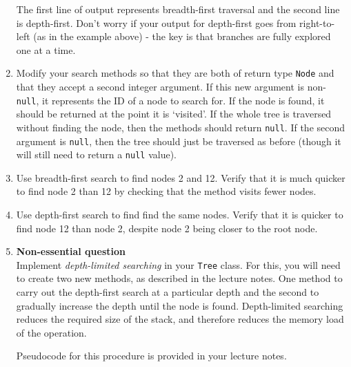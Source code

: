 \documentclass[11pt,a4paper]{report}
\begin{document}
\begin{enumerate}
The first line of output represents breadth-first traversal and the second line is depth-first. Don't worry if your output for depth-first goes from right-to-left (as in the example above) - the key is that branches are fully explored one at a time. 

\item Modify your search methods so that they are both of return type \texttt{Node} and that they accept a second integer argument. If this new argument is non-\texttt{null}, it represents the ID of a node to search for. If the node is found, it should be returned at the point it is `visited'. If the whole tree is traversed without finding the node, then the methods should return \texttt{null}. If the second argument is \texttt{null}, then the tree should just be traversed as before (though it will still need to return a \texttt{null} value).

\item Use breadth-first search to find nodes 2 and 12. Verify that it is much quicker to find node 2 than 12 by checking that the method visits fewer nodes.

\item Use depth-first search to find find the same nodes. Verify that it is quicker to find node 12 than node 2, despite node 2 being closer to the root node.

\item \textbf{Non-essential question}\\
        Implement \textit{depth-limited searching} in your \texttt{Tree} class. For this, you will need to create two new methods, as described in the lecture notes. One method to carry out the depth-first search at a particular depth and the second to gradually increase the depth until the node is found. Depth-limited searching reduces the required size of the stack, and therefore reduces the memory load of the operation.

        Pseudocode for this procedure is provided in your lecture notes.


\end{enumerate}
\end{document}
